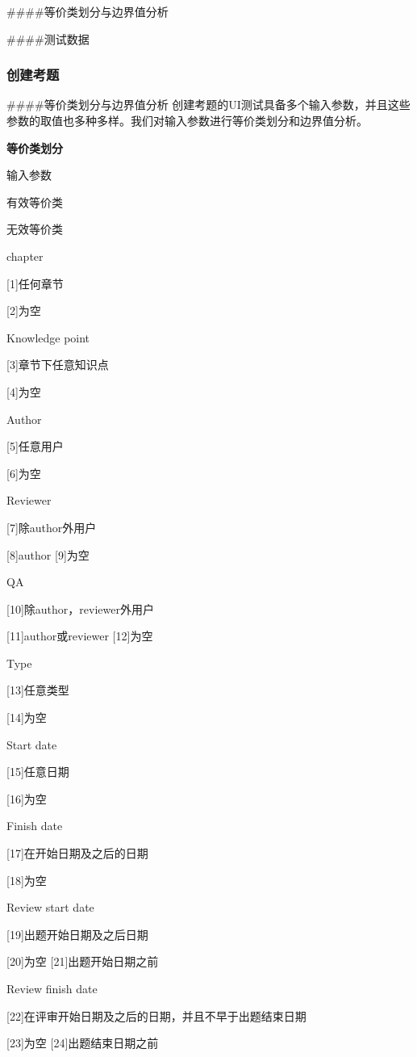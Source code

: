\documentclass[hyperref, a4paper]{ctexart}
\begin{document}
\#\#\#\#等价类划分与边界值分析

\#\#\#\#测试数据

\hypertarget{ux521bux5efaux8003ux9898-1}{%
\subsubsection{创建考题}\label{ux521bux5efaux8003ux9898-1}}

\#\#\#\#等价类划分与边界值分析
创建考题的UI测试具备多个输入参数，并且这些参数的取值也多种多样。我们对输入参数进行等价类划分和边界值分析。

\textbf{等价类划分}

输入参数

有效等价类

无效等价类

chapter

{[}1{]}任何章节

{[}2{]}为空

Knowledge point

{[}3{]}章节下任意知识点

{[}4{]}为空

Author

{[}5{]}任意用户

{[}6{]}为空

Reviewer

{[}7{]}除author外用户

{[}8{]}author {[}9{]}为空

QA

{[}10{]}除author，reviewer外用户

{[}11{]}author或reviewer {[}12{]}为空

Type

{[}13{]}任意类型

{[}14{]}为空

Start date

{[}15{]}任意日期

{[}16{]}为空

Finish date

{[}17{]}在开始日期及之后的日期

{[}18{]}为空

Review start date

{[}19{]}出题开始日期及之后日期

{[}20{]}为空 {[}21{]}出题开始日期之前

Review finish date

{[}22{]}在评审开始日期及之后的日期，并且不早于出题结束日期

{[}23{]}为空 {[}24{]}出题结束日期之前
\end{document}
